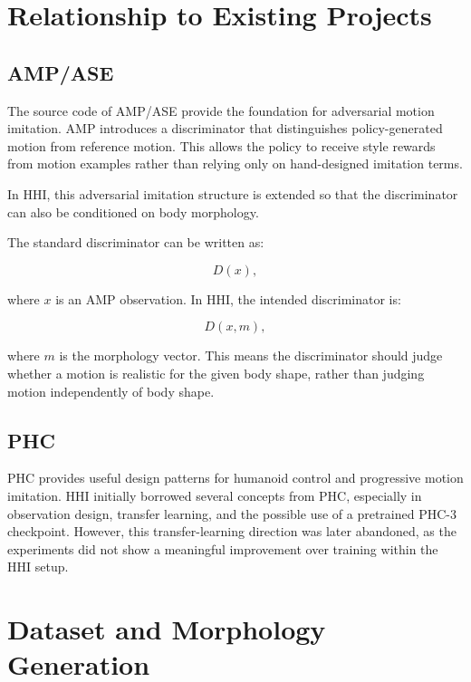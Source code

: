 \documentclass[11pt,a4paper]{article}
\begin{document}
\section{Relationship to Existing Projects}

\subsection{AMP/ASE}

The source code of AMP/ASE provide the foundation for adversarial motion imitation. AMP introduces a discriminator that distinguishes policy-generated motion from reference motion. This allows the policy to receive style rewards from motion examples rather than relying only on hand-designed imitation terms.

In HHI, this adversarial imitation structure is extended so that the discriminator can also be conditioned on body morphology.

The standard discriminator can be written as:

\begin{equation}
    D(x),
\end{equation}

where $x$ is an AMP observation. In HHI, the intended discriminator is:

\begin{equation}
    D(x, m),
\end{equation}

where $m$ is the morphology vector. This means the discriminator should judge whether a motion is realistic for the given body shape, rather than judging motion independently of body shape.

\subsection{PHC}

PHC provides useful design patterns for humanoid control and progressive motion imitation. HHI initially borrowed several concepts from PHC, especially in observation design, transfer learning, and the possible use of a pretrained PHC-3 checkpoint. However, this transfer-learning direction was later abandoned, as the experiments did not show a meaningful improvement over training within the HHI setup.

\section{Dataset and Morphology Generation}
\end{document}
